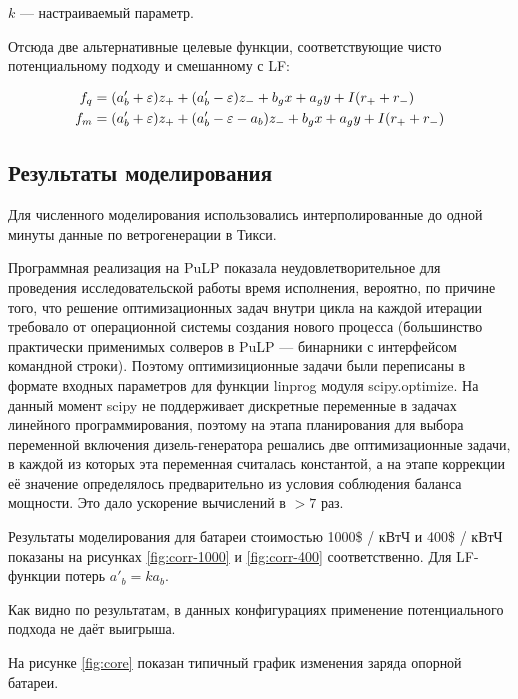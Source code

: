 $k$ --- настраиваемый параметр.

Отсюда две альтернативные целевые функции, соответствующие чисто потенциальному подходу и смешанному с LF:

\begin{equation}
\begin{split}
f_q &= (a'_b + \varepsilon) z_+ + (a'_b - \varepsilon) z_- + b_g x + a_g y + I(r_+ + r_-)\\
f_m &= (a'_b + \varepsilon) z_+ + (a'_b - \varepsilon - a_b) z_- + b_g x + a_g y + I(r_+ + r_-)
\end{split}
\end{equation}
         
\subsection{Результаты моделирования}
        
    Для численного моделирования использовались интерполированные до одной минуты данные по ветрогенерации в Тикси.
    
    Программная реализация на PuLP показала неудовлетворительное для проведения исследовательской работы время исполнения,
    вероятно, по причине того, что решение оптимизационных задач внутри цикла на каждой итерации требовало от операционной системы создания нового процесса
    (большинство практически применимых солверов в PuLP --- бинарники с интерфейсом командной строки).
    Поэтому оптимизиционные задачи были переписаны в формате входных параметров для функции linprog модуля scipy.optimize.
    На данный момент scipy не поддерживает дискретные переменные в задачах линейного программирования, поэтому на этапа планирования для выбора переменной включения дизель-генератора решались две оптимизационные задачи, в каждой из которых эта переменная считалась константой, а на этапе коррекции её значение определялось предварительно из условия соблюдения баланса мощности.
    Это дало ускорение вычислений в $>7$ раз.
    
    Результаты моделирования для батареи стоимостью 1000\$ / кВтЧ и 400\$ / кВтЧ показаны на рисунках \ref{fig:corr-1000} и \ref{fig:corr-400} соответственно.
    Для LF-функции потерь $a'_b = k a_b$.
    
    Как видно по результатам, в данных конфигурациях применение потенциального подхода не даёт выигрыша.
    
    На рисунке \ref{fig:core} показан типичный график изменения заряда опорной батареи.
    
